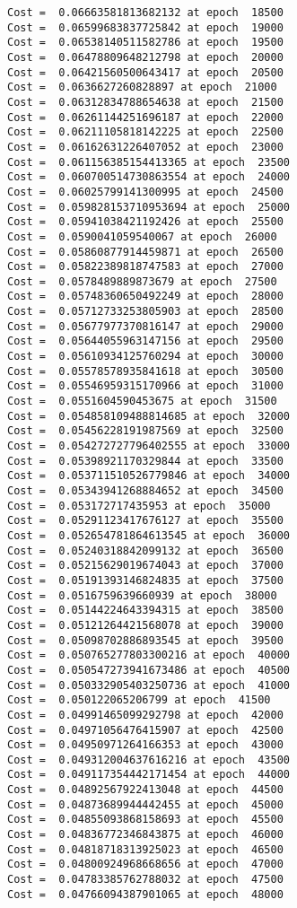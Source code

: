 \documentclass[11pt]{article}
\begin{document}
\begin{Verbatim}[commandchars=\\\{\}]
Cost =  0.06663581813682132 at epoch  18500
Cost =  0.06599683837725842 at epoch  19000
Cost =  0.06538140511582786 at epoch  19500
Cost =  0.06478809648212798 at epoch  20000
Cost =  0.06421560500643417 at epoch  20500
Cost =  0.0636627260828897 at epoch  21000
Cost =  0.06312834788654638 at epoch  21500
Cost =  0.06261144251696187 at epoch  22000
Cost =  0.06211105818142225 at epoch  22500
Cost =  0.06162631226407052 at epoch  23000
Cost =  0.061156385154413365 at epoch  23500
Cost =  0.060700514730863554 at epoch  24000
Cost =  0.06025799141300995 at epoch  24500
Cost =  0.059828153710953694 at epoch  25000
Cost =  0.05941038421192426 at epoch  25500
Cost =  0.0590041059540067 at epoch  26000
Cost =  0.05860877914459871 at epoch  26500
Cost =  0.05822389818747583 at epoch  27000
Cost =  0.0578489889873679 at epoch  27500
Cost =  0.05748360650492249 at epoch  28000
Cost =  0.05712733253805903 at epoch  28500
Cost =  0.05677977370816147 at epoch  29000
Cost =  0.05644055963147156 at epoch  29500
Cost =  0.05610934125760294 at epoch  30000
Cost =  0.05578578935841618 at epoch  30500
Cost =  0.05546959315170966 at epoch  31000
Cost =  0.0551604590453675 at epoch  31500
Cost =  0.054858109488814685 at epoch  32000
Cost =  0.05456228191987569 at epoch  32500
Cost =  0.054272727796402555 at epoch  33000
Cost =  0.05398921170329844 at epoch  33500
Cost =  0.053711510526779846 at epoch  34000
Cost =  0.05343941268884652 at epoch  34500
Cost =  0.053172717435953 at epoch  35000
Cost =  0.05291123417676127 at epoch  35500
Cost =  0.052654781864613545 at epoch  36000
Cost =  0.05240318842099132 at epoch  36500
Cost =  0.05215629019674043 at epoch  37000
Cost =  0.05191393146824835 at epoch  37500
Cost =  0.0516759639660939 at epoch  38000
Cost =  0.05144224643394315 at epoch  38500
Cost =  0.05121264421568078 at epoch  39000
Cost =  0.05098702886893545 at epoch  39500
Cost =  0.050765277803300216 at epoch  40000
Cost =  0.050547273941673486 at epoch  40500
Cost =  0.050332905403250736 at epoch  41000
Cost =  0.050122065206799 at epoch  41500
Cost =  0.04991465099292798 at epoch  42000
Cost =  0.04971056476415907 at epoch  42500
Cost =  0.04950971264166353 at epoch  43000
Cost =  0.049312004637616216 at epoch  43500
Cost =  0.049117354442171454 at epoch  44000
Cost =  0.04892567922413048 at epoch  44500
Cost =  0.04873689944442455 at epoch  45000
Cost =  0.04855093868158693 at epoch  45500
Cost =  0.04836772346843875 at epoch  46000
Cost =  0.04818718313925023 at epoch  46500
Cost =  0.04800924968668656 at epoch  47000
Cost =  0.04783385762788032 at epoch  47500
Cost =  0.04766094387901065 at epoch  48000

\end{Verbatim}
\end{document}
